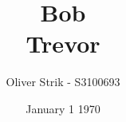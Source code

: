 \documentclass[11pt, a4paper]{article}
\begin{document}
\begin{titlepage}
  \centering
  \title{Bob \\\large Trevor}
  \author{Oliver Strik - S3100693}
  \date{January 1 1970}
  \maketitle
\end{titlepage}

\begin{abstract}
\noindent\blindtext
\end{abstract}
\pagebreak\tableofcontents
\pagebreak
\pagebreak


\end{document}
